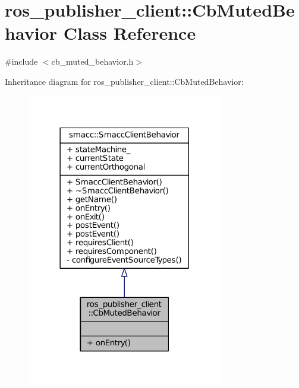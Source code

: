 \hypertarget{classros__publisher__client_1_1CbMutedBehavior}{}\section{ros\+\_\+publisher\+\_\+client\+:\+:Cb\+Muted\+Behavior Class Reference}
\label{classros__publisher__client_1_1CbMutedBehavior}


{\ttfamily \#include $<$cb\+\_\+muted\+\_\+behavior.\+h$>$}



Inheritance diagram for ros\+\_\+publisher\+\_\+client\+:\+:Cb\+Muted\+Behavior\+:
\nopagebreak
\begin{figure}[H]
\begin{center}
\leavevmode
\includegraphics[width=242pt]{classros__publisher__client_1_1CbMutedBehavior__inherit__graph}
\end{center}
\end{figure}


